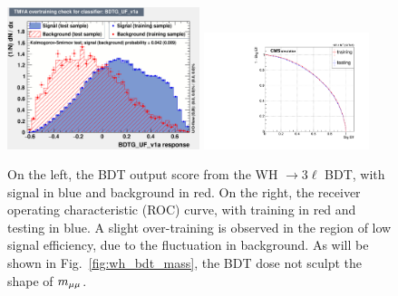 \begin{figure}[!htb]
      \centering
      \captionsetup{justification=justified}
      \includegraphics[width=0.50\textwidth]{pics/VH_sec/BDT_train_WH/WH_BDT_overtrain.pdf}
      \includegraphics[width=0.43\textwidth]{pics/VH_sec/BDT_train_WH/WH_BDT_ROC.pdf}
      \caption{On the left, the BDT output score from the WH $\to 3\ell$ BDT, with signal in blue
      and background in red.  On the right, the receiver operating characteristic (ROC) curve, 
      with training in red and testing in blue. A slight over-training is observed in the region of
      low signal efficiency, due to the fluctuation in background. As will be shown in Fig.~\ref{fig:wh_bdt_mass}, 
      the BDT dose not sculpt the shape of $m_{\mu\mu}$.}
      \label{fig:wh_bdt_output}
  \end{figure}
  
